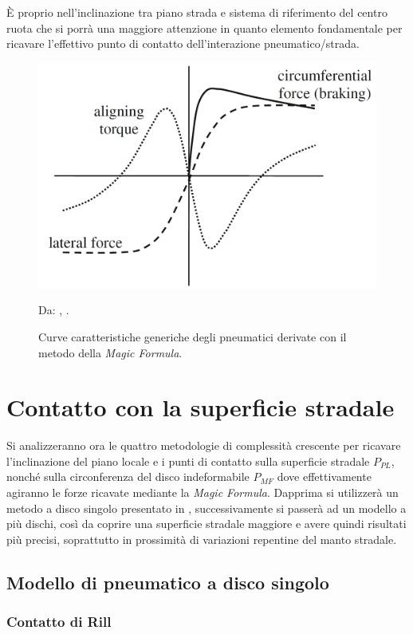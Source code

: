 È proprio nell'inclinazione tra piano strada e sistema di riferimento del centro ruota che si porrà una maggiore attenzione in quanto elemento fondamentale per ricavare l'effettivo punto di contatto dell'interazione pneumatico/strada.
%
\begin{figure}[h]
	\centering
	\includegraphics[width=0.58\linewidth]{Figures/pacejka}
	\caption{Curve caratteristiche generiche degli pneumatici derivate con il metodo della \textit{Magic Formula}.}
	Da: \citeauthor{Schramm}, .
	\label{pacejka}
\end{figure}
%
\section{Contatto con la superficie stradale}
%
Si analizzeranno ora le quattro metodologie di complessità crescente per ricavare l'inclinazione del piano locale e i punti di contatto sulla superficie stradale $P_{PL}$, nonché sulla circonferenza del disco indeformabile $P_{MF}$ dove effettivamente agiranno le forze ricavate mediante la \textit{Magic Formula}. Dapprima si utilizzerà un metodo a disco singolo presentato in \cite{Rill}, successivamente si passerà ad un modello a più dischi, così da coprire una superficie stradale maggiore e avere quindi risultati più precisi, soprattutto in prossimità di variazioni repentine del manto stradale.
%
\subsection{Modello di pneumatico a disco singolo}
%
\subsubsection{Contatto di Rill}
\label{Contatto_Rill}
%
